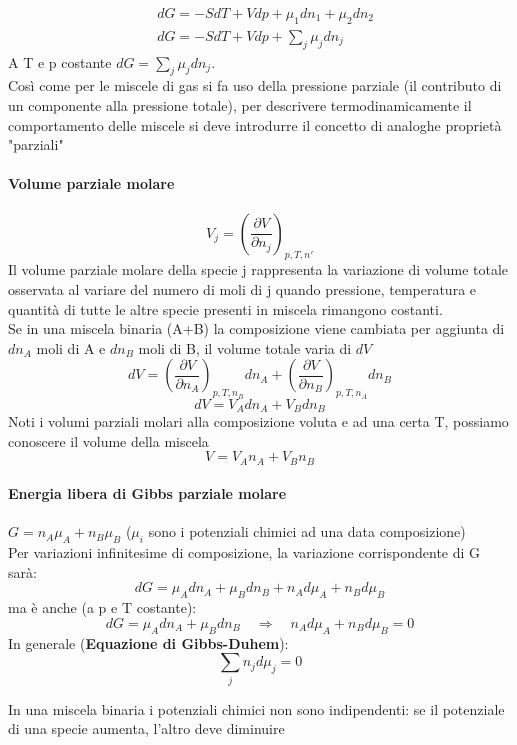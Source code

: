 \documentclass{article}
\newcommand{\So}{\quad \Rightarrow \quad}
\begin{document}
\begin{align*}
    &dG=-SdT+Vdp+\mu_1dn_1+\mu_2dn_2\\
    &dG=-SdT+Vdp+\sum_j\mu_jdn_j
\end{align*}
A T e p costante $dG=\sum_j\mu_jdn_j$.\\
Così come per le miscele di gas si fa uso della pressione parziale (il contributo di un componente alla pressione totale), per descrivere termodinamicamente il comportamento delle miscele si deve introdurre il concetto di analoghe proprietà "parziali"
 \paragraph{Volume parziale molare}
 \begin{equation*}
     V_j=(\frac{\partial V}{\partial n_j})_{p,T,n'}
 \end{equation*}
Il volume parziale molare della specie j rappresenta la variazione di volume totale osservata al variare del numero di moli di j quando pressione, temperatura e quantità di tutte le altre specie presenti in miscela rimangono costanti. \\
Se in una miscela binaria (A+B) la composizione viene cambiata per aggiunta di $dn_A$ moli di A e $dn_B$ moli di B, il volume totale varia di $dV$
\begin{equation*}
    dV=(\frac{\partial V}{\partial n_A})_{p, T, n_B}dn_A+(\frac{\partial V}{\partial n_B})_{p, T, n_A}dn_B
\end{equation*}
\begin{equation*}
    dV=V_Adn_A+V_Bdn_B
\end{equation*}
Noti i volumi parziali molari alla composizione voluta e ad una certa T, possiamo conoscere il volume  della miscela
\begin{equation*}
     V=V_An_A+V_Bn_B
\end{equation*}

\paragraph{Energia libera di Gibbs parziale molare} $G=n_A\mu_A+n_B\mu_B$ ($\mu_i$ sono i potenziali chimici ad una data composizione)\\
Per variazioni infinitesime di composizione, la variazione corrispondente di G sarà:
\begin{equation*}
    dG=\mu_Adn_A+\mu_Bdn_B+n_Ad\mu_A+n_Bd\mu_B
\end{equation*}
ma è anche (a p e T costante):
\begin{equation*}
    dG=\mu_Adn_A+\mu_Bdn_B \So  n_Ad\mu_A+n_Bd\mu_B=0
\end{equation*}
In generale (\textbf{Equazione di Gibbs-Duhem}):
\begin{equation}
    \sum_jn_jd\mu_j=0
\end{equation}
\begin{center}
    In una miscela binaria i potenziali chimici non sono indipendenti: se il potenziale di una specie aumenta, l'altro deve diminuire
\end{center}
\end{document}
